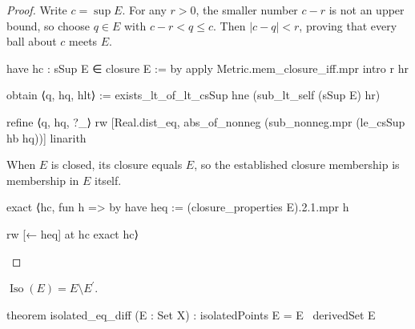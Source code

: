 \begin{proof}
  Write $c=\sup E$.
  For any $r>0$, the smaller number $c-r$ is not an upper bound, so choose $q\in E$ with $c-r<q\leq
    c$.
  Then $|c-q|<r$, proving that every ball about $c$ meets $E$.

  \begin{lean}
    have hc : sSup E ∈ closure E := by
      apply Metric.mem_closure_iff.mpr
      intro r hr

      obtain ⟨q, hq, hlt⟩ := exists_lt_of_lt_csSup hne (sub_lt_self (sSup E) hr)

      refine ⟨q, hq, ?_⟩
      rw [Real.dist_eq, abs_of_nonneg (sub_nonneg.mpr (le_csSup hb hq))]
      linarith
  \end{lean}

  When $E$ is closed, its closure equals $E$, so the established closure membership is membership
  in $E$ itself.

  \begin{lean}
    exact ⟨hc, fun h => by
      have heq := (closure_properties E).2.1.mpr h

      rw [← heq] at hc
      exact hc⟩
  \end{lean}

\end{proof}

\begin{proposition}
  \label{ma:thm:isolated-points-are-self-minus-limit-points}
  $\operatorname{Iso}(E)=E\setminus E^{\prime}$.

  \begin{lean}
    theorem isolated_eq_diff (E : Set X) : isolatedPoints E = E \ derivedSet E
  \end{lean}
\end{proposition}

